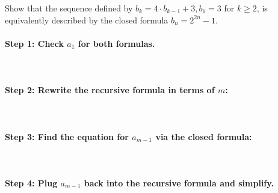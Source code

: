 \documentclass[../Template-Assignment.tex]{subfiles}
\begin{document}
        \begin{questionNOGRADE}{\thequestion}

            Show that the sequence defined by $b_{k} = 4 \cdot b_{k-1} + 3, b_{1} = 3$ for $k \geq 2$,
            is equivalently described by the closed formula $b_{n} = 2^{2n} - 1$.

        \paragraph{Step 1: Check $a_{1}$ for both formulas.} ~\\
            
        \paragraph{Step 2: Rewrite the recursive formula in terms of $m$:} ~\\

        \paragraph{Step 3: Find the equation for $a_{m-1}$ via the closed formula:} ~\\

        \paragraph{Step 4: Plug $a_{m-1}$ back into the recursive formula and simplify.} ~\\

        \end{questionNOGRADE}
\end{document}
